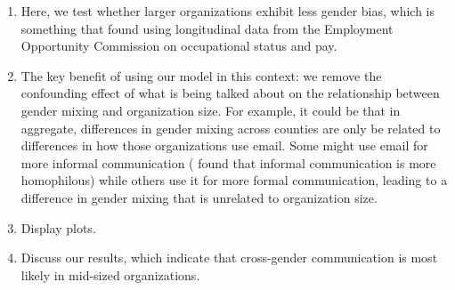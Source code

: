 \documentclass[fleqn]{MJDArticle}
\begin{document}
\begin{enumerate}
	\item Here, we test whether larger organizations exhibit less gender bias, which is something that \cite{Huffman2010} found using longitudinal data from the Employment Opportunity Commission on occupational status and pay. 
	\item The key benefit of using our model in this context: we remove the confounding effect of what is being talked about on the relationship between gender mixing and organization size. For example, it could be that in aggregate, differences in gender mixing across counties are only be related to differences in how those organizations use email. Some might use email for more informal communication (\citep{Ibarra1992} found that informal communication is more homophilous) while others use it for more formal communication, leading to a difference in gender mixing that is unrelated to organization size.
	\item Display plots.
	\item Discuss our results, which indicate that cross-gender communication is most likely in mid-sized organizations. 
\end{enumerate}






\end{document}
